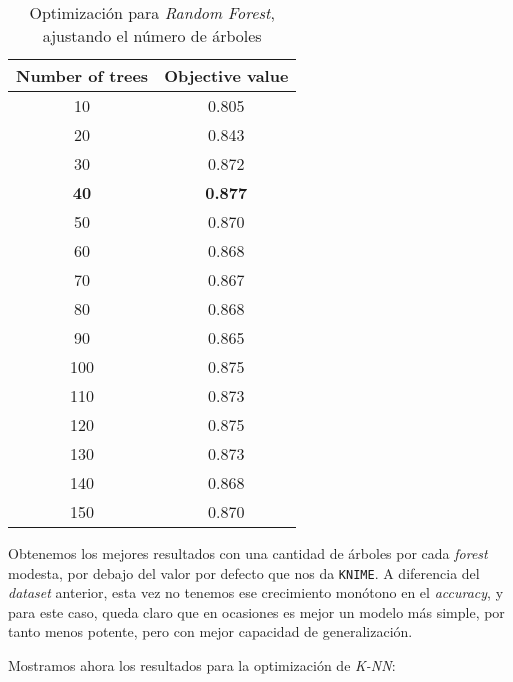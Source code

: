 \documentclass[11pt]{article}
\begin{document}
\begin{table}[H]
\begin{center}
    \begin{tabular}{|c|c|}
        \hline
        Number of trees & Objective value \\
        \hline
        10 & 0.805 \\
        20 & 0.843 \\
        30 & 0.872 \\
        \textbf{40} & \textbf{0.877} \\
        50 & 0.870 \\
        60 & 0.868 \\
        70 & 0.867 \\
        80 & 0.868 \\
        90 & 0.865 \\
        100 & 0.875 \\
        110 & 0.873 \\
        120 & 0.875 \\
        130 & 0.873 \\
        140 & 0.868 \\
        150 & 0.870 \\
        \hline
    \end{tabular}
\end{center}
    \caption{Optimización para \emph{Random Forest}, ajustando el número de árboles}
\end{table}

Obtenemos los mejores resultados con una cantidad de árboles por cada \emph{forest} modesta, por debajo del valor por defecto que nos da \lstinline{KNIME}. A diferencia del \emph{dataset} anterior, esta vez no tenemos ese crecimiento monótono en el \emph{accuracy}, y para este caso, queda claro que en ocasiones es mejor un modelo más simple, por tanto menos potente, pero con mejor capacidad de generalización.

Mostramos ahora los resultados para la optimización de \emph{K-NN}:
\end{document}
